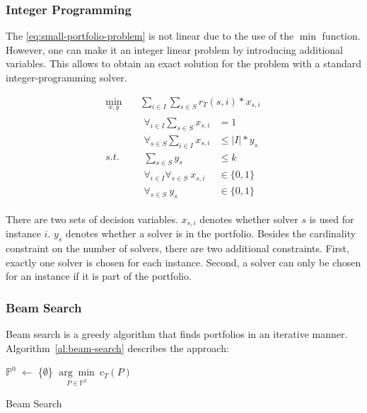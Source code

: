 \subsubsection{Integer Programming}

The \ref{eq:small-portfolio-problem} is not linear due to the use of the $\min$ function.
However, one can make it an integer linear problem by introducing additional variables.
This allows to obtain an exact solution for the problem with a standard integer-programming solver.

\begin{equation}
	\label{eq:small-portfolio-integer-problem}
	\begin{aligned}
		\min_{x,y} \quad & \sum_{i \in I} \sum_{s \in S} r_T(s,i) * x_{s,i} \\
		s.t. \quad & \begin{aligned}
			\forall_{i\in I} \sum_{s \in S} x_{s,i} &= 1\\
			\forall_{s \in S} \sum_{i \in I} x_{s,i} &\leq |I| * y_s\\
			\sum_{s \in S} y_s &\leq k\\
			\forall_{i\in I} \forall_{s \in S}~x_{s,i} &\in \{0, 1\}\\
			\forall_{s \in S}~y_s &\in \{0,1\}
		\end{aligned}
	\end{aligned}
	\tag{Small-Portfolio Integer Problem}
\end{equation}

There are two sets of decision variables.
$x_{s,i}$ denotes whether solver $s$ is used for instance $i$.
$y_s$ denotes whether a solver is in the portfolio.
Besides the cardinality constraint on the number of solvers, there are two additional constraints.
First, exactly one solver is chosen for each instance.
Second, a solver can only be chosen for an instance if it is part of the portfolio.

\subsubsection{Beam Search}

Beam search is a greedy algorithm that finds portfolios in an iterative manner.
Algorithm~\ref{al:beam-search} describes the approach:

\begin{algorithm}[htb]
	$\mathbb{P}^0$ $\leftarrow$ \{$\emptyset$\}
	\Return $\underset{P \in \mathbb{P}^k}{\arg\min}~c_{T}(P)$\;
	\caption{Beam Search}
	\label{al:beam-search}
\end{algorithm}

